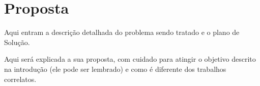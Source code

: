 \section{Proposta}




Aqui entram a descrição detalhada do problema sendo tratado e o plano de Solução.

Aqui será explicada a sua proposta, com cuidado para atingir o objetivo descrito na introdução (ele pode ser lembrado) e como é diferente dos trabalhos correlatos.





